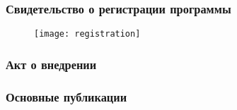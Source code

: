 \begin{frame}
    \frametitle{Свидетельство о регистрации программы}
    \begin{figure}[h]
        \centering
        \texttt{[image: registration]}
    \end{figure}
\end{frame}

\begin{frame}
    \frametitle{Акт о внедрении}
    \begin{figure}[h]
        \centering
    \end{figure}
\end{frame}

\begin{frame}[t,allowframebreaks] %
    \frametitle{Основные публикации}
    \nocite{RFID_JRFID2017}
    \nocite{WINET_IJPAM2016}
    \nocite{WINET_TCOMM2015}
    \nocite{QS_JPU2013}
    \nocite{QS_JITCS2013}
    \nocite{QS_TCOMM2012}


    \nocite{QS_ICAAPSP2020}
    \nocite{QS_ITMM2019}
    \nocite{RFID_IEEERFID2018}
    \nocite{RFID_SYNCHROINFO2018}
    \nocite{RFID_IEEERFID2017}
    \nocite{QS_AICT2017}
    \nocite{QS_ITMM2017}
    \nocite{QS_ITMM2016}
    \nocite{QS_DCCN2016_CCIS}
    \nocite{RFID_DCCN2016_CCIS}
    \nocite{RFIDCTRL_NETS2CARS2014}
    \nocite{RFIDTA2012}


\end{frame}

